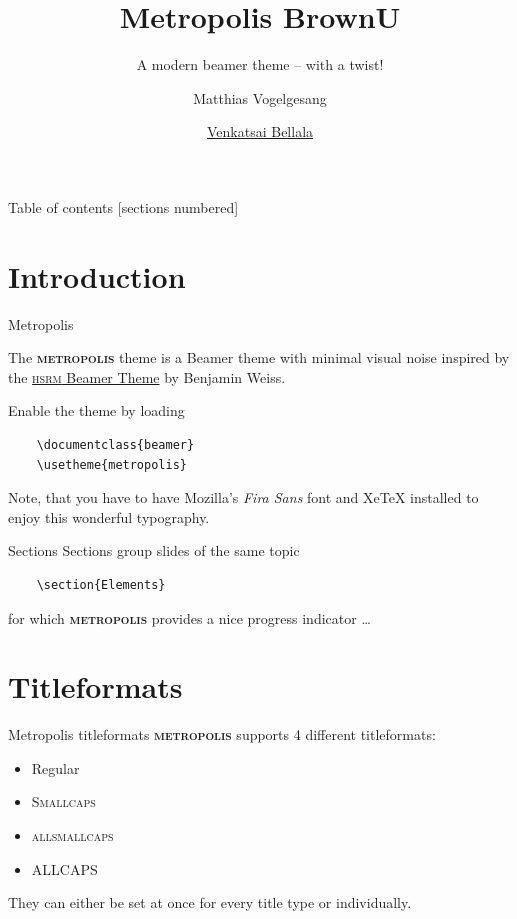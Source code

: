\documentclass[10pt]{beamer}
\title{Metropolis BrownU}
\subtitle{A modern beamer theme -- with a twist!}
\date{}
\author{Matthias Vogelgesang \and \href{https://bellala.org/}{Venkatsai Bellala}}
\institute{Center for modern beamer themes}
\newcommand{\themename}{\textbf{\textsc{metropolis}}\xspace}
\begin{document}
\maketitle

\begin{frame}{Table of contents}
  [sections numbered]
  \tableofcontents%
\end{frame}

\section[Intro]{Introduction}

\begin{frame}[fragile]{Metropolis}

  The \themename theme is a Beamer theme with minimal visual noise
  inspired by the \href{https://github.com/hsrmbeamertheme/hsrmbeamertheme}{\textsc{hsrm} Beamer
  Theme} by Benjamin Weiss.

  Enable the theme by loading

  \begin{verbatim}    \documentclass{beamer}
    \usetheme{metropolis}\end{verbatim}

  Note, that you have to have Mozilla's \emph{Fira Sans} font and XeTeX
  installed to enjoy this wonderful typography.
\end{frame}
\begin{frame}[fragile]{Sections}
  Sections group slides of the same topic

  \begin{verbatim}    \section{Elements}\end{verbatim}

  for which \themename provides a nice progress indicator \ldots
  
\end{frame}

\section{Titleformats}

\begin{frame}{Metropolis titleformats}
	\themename supports 4 different titleformats:
	\begin{itemize}
		\item Regular
		\item \textsc{Smallcaps}
		\item \textsc{allsmallcaps}
		\item ALLCAPS
	\end{itemize}
	They can either be set at once for every title type or individually.
\end{frame}
\end{document}
